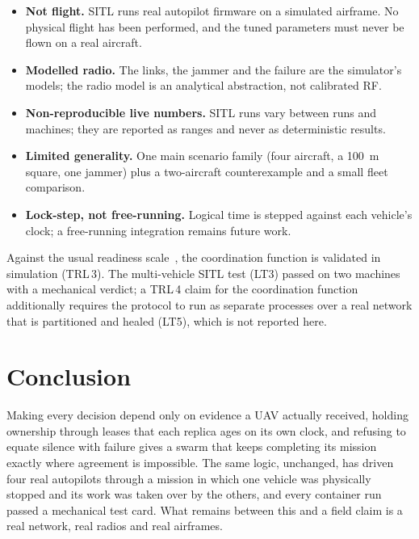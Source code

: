 \documentclass[a4paper,11pt]{article}
\begin{document}
\begin{itemize}[leftmargin=*]
\item \textbf{Not flight.} SITL runs real autopilot firmware on a simulated
  airframe. No physical flight has been performed, and the tuned parameters
  must never be flown on a real aircraft.
\item \textbf{Modelled radio.} The links, the jammer and the failure are the
  simulator's models; the radio model is an analytical abstraction, not
  calibrated RF.
\item \textbf{Non-reproducible live numbers.} SITL runs vary between runs and
  machines; they are reported as ranges and never as deterministic results.
\item \textbf{Limited generality.} One main scenario family (four aircraft, a
  \SI{100}{m} square, one jammer) plus a two-aircraft counterexample and a
  small fleet comparison.
\item \textbf{Lock-step, not free-running.} Logical time is stepped against
  each vehicle's clock; a free-running integration remains future work.
\end{itemize}

Against the usual readiness scale~\cite{ec2014trl}, the coordination function is
validated in simulation (TRL\,3). The multi-vehicle SITL test (LT3) passed on
two machines with a mechanical verdict; a TRL\,4 claim for the coordination
function additionally requires the protocol to run as separate processes over
a real network that is partitioned and healed (LT5), which is not reported here.

\section{Conclusion}

Making every decision depend only on evidence a UAV actually received, holding
ownership through leases that each replica ages on its own clock, and refusing
to equate silence with failure gives a swarm that keeps completing its mission
exactly where agreement is impossible. The same logic, unchanged, has driven
four real autopilots through a mission in which one vehicle was physically
stopped and its work was taken over by the others, and every container run
passed a mechanical test card. What remains between this and a field claim is a real
network, real radios and real airframes.

\printbibliography

\appendix
\end{document}
